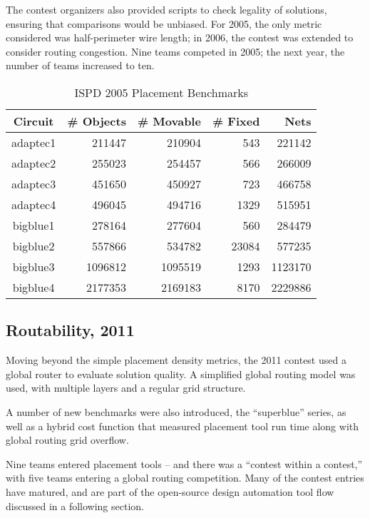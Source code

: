 \documentclass[sigconf]{acmart}
\begin{document}
The contest organizers also provided scripts to
check legality of solutions, ensuring that comparisons
would be unbiased.  For 2005, the only metric
considered was half-perimeter wire length; in 2006,
the contest was extended to consider routing congestion.
Nine teams competed in 2005; the next year, the number
of teams increased to ten.

\begin{table}
  \caption{ISPD 2005 Placement Benchmarks}
  \begin{tabular}{|c||r|r|r|r|}\hline
    Circuit & \# Objects & \# Movable & \# Fixed & Nets \\ \hline
adaptec1 & 211447 & 210904 & 543 & 221142  \\
adaptec2 & 255023 & 254457 & 566 & 266009  \\
adaptec3 & 451650 & 450927 & 723 & 466758  \\
adaptec4 & 496045 & 494716 & 1329 & 515951  \\
bigblue1 & 278164 & 277604 & 560 & 284479  \\
bigblue2 & 557866 & 534782 & 23084 & 577235  \\
bigblue3 & 1096812 & 1095519 & 1293 & 1123170  \\
bigblue4 & 2177353 & 2169183 & 8170 & 2229886  \\ \hline
\end{tabular}
\end{table}


\subsection{Routability, 2011}

\iffalse

Details, cite some papers.
\fi

Moving beyond the simple placement density metrics,
the 2011 contest used a global router to evaluate
solution quality.  A simplified global routing
model was used, with multiple layers and a regular
grid structure.

A number of new benchmarks were also introduced, the
``superblue'' series, as well as a hybrid cost function
that measured placement tool run time along with
global routing grid overflow.

Nine teams entered placement tools -- and there was
a ``contest within a contest,'' with five teams
entering a global routing competition.  Many of the
contest entries have matured, and are part of the
open-source design automation tool flow discussed in
a following section.
\end{document}
